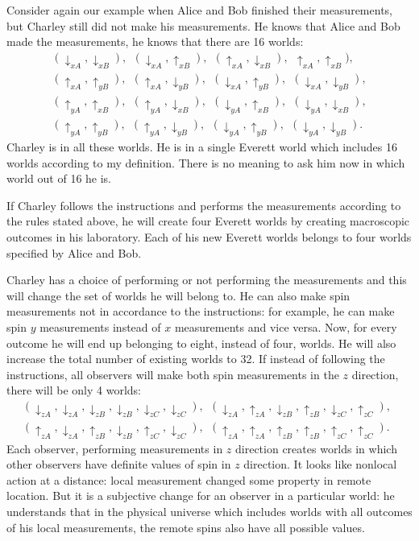\documentclass[11pt]{article}
\begin{document}
 Consider again our example when Alice and Bob finished their measurements, but Charley still did not make his measurements. He knows that Alice and Bob made the measurements, he knows that there are 16 worlds:
 \begin{eqnarray}
\nonumber
 (\downarrow_{xA}, \downarrow_{xB}),~~(\downarrow_{xA}, \uparrow_{xB}),~~(\uparrow_{xA}, \downarrow_{xB}),~~\uparrow_{xA}, \uparrow_{xB}),\\ \nonumber
 (\uparrow_{xA}, \uparrow_{yB}),    ~~(\uparrow_{xA}, \downarrow_{yB}),
 ~~(\downarrow_{xA}, \uparrow_{yB}),~~(\downarrow_{xA}, \downarrow_{yB}), \\
 (\uparrow_{yA}, \uparrow_{xB}),~~(\uparrow_{yA}, \downarrow_{xB}), ~~(\downarrow_{yA}, \uparrow_{xB}),~~(\downarrow_{yA}, \downarrow_{xB}),\\
 (\uparrow_{yA}, \uparrow_{yB}),  ~~(\uparrow_{yA}, \downarrow_{yB}),~~(\downarrow_{yA}, \uparrow_{yB}),~~(\downarrow_{yA}, \downarrow_{yB}).\nonumber
  \end{eqnarray}
 Charley is in all these worlds. He is in a single Everett world which includes 16 worlds according to my definition. There is no meaning to ask him now in which world out of 16 he is.

 If Charley follows the instructions and performs the measurements according to the rules stated above, he will create four Everett worlds by creating macroscopic outcomes in his laboratory. Each of his new Everett worlds belongs to four worlds specified by Alice and Bob.
  
  Charley has a choice of performing or not performing the measurements and this will change the set of worlds he  will belong to. He can also make spin measurements not in accordance to the instructions: for example, he can make spin $y$ measurements instead of $x$ measurements and vice versa. Now, for every outcome he will end up belonging to eight, instead of four, worlds. He will also increase the total number of existing worlds to 32. If instead of following the instructions, all observers will make both spin measurements in the $z$ direction, there will be only 4 worlds:
\begin{eqnarray}
\nonumber
 (\downarrow_{zA},\downarrow_{zA},\downarrow_{zB},\downarrow_{zB}, \downarrow_{zC}, \downarrow_{zC}),~~
  (\downarrow_{zA},\uparrow_{zA},\downarrow_{zB},\uparrow_{zB}, \downarrow_{zC}, \uparrow_{zC}),~~\\
   (\uparrow_{zA},\downarrow_{zA},\uparrow_{zB},\downarrow_{zB}, \uparrow_{zC}, \downarrow_{zC}),~~
    (\uparrow_{zA},\uparrow_{zA},\uparrow_{zB},\uparrow_{zB}, \uparrow_{zC}, \uparrow_{zC}).~~
   \end{eqnarray}
Each observer, performing measurements in  $z$ direction creates worlds in which other observers have definite values of spin in $z$ direction. It looks like nonlocal action at a distance: local measurement changed some property in remote location. But it is a subjective change for an observer in a particular world: he  understands that in the physical universe which includes worlds with all outcomes of his local measurements, the remote spins also have all possible values.
\end{document}
